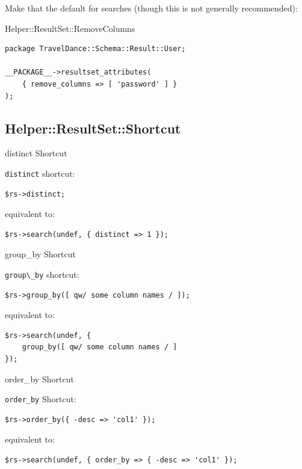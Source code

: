 Make that the default for searches (though this is not generally recommended):

\begin{frame}[fragile]{Helper::ResultSet::RemoveColumns}
\begin{lstlisting}
package TravelDance::Schema::Result::User;

__PACKAGE__->resultset_attributes(
    { remove_columns => [ 'password' ] }
);
\end{lstlisting}
\end{frame}

\subsection{Helper::ResultSet::Shortcut}

\begin{frame}[fragile]{distinct Shortcut}

\verb|distinct| shortcut:

\begin{lstlisting}
$rs->distinct;
\end{lstlisting}

equivalent to:

\begin{lstlisting}
$rs->search(undef, { distinct => 1 });
\end{lstlisting}
\end{frame}

\begin{frame}[fragile]{group\_by Shortcut}

\verb|group\_by| shortcut:

\begin{lstlisting}
$rs->group_by([ qw/ some column names / ]);
\end{lstlisting}

equivalent to:

\begin{lstlisting}
$rs->search(undef, { 
    group_by([ qw/ some column names / ] 
});
\end{lstlisting}
\end{frame}

\begin{frame}[fragile]{order\_by Shortcut}

\verb|order_by| Shortcut:

\begin{lstlisting}
$rs->order_by({ -desc => 'col1' });
\end{lstlisting}

equivalent to:

\begin{lstlisting}
$rs->search(undef, { order_by => { -desc => 'col1' });
\end{lstlisting}

\end{frame}

